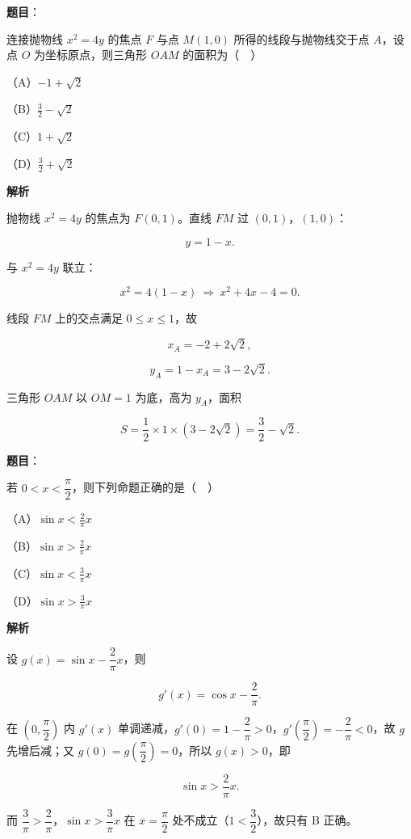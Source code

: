 \begin{answer}

\textbf{题目}：

连接抛物线 $x^2=4y$ 的焦点 $F$ 与点 $M(1,0)$ 所得的线段与抛物线交于点 $A$，设点 $O$ 为坐标原点，则三角形 $OAM$ 的面积为（　）

（A）$-1+\sqrt2$

（B）$\frac32-\sqrt2$

（C）$1+\sqrt2$

（D）$\frac32+\sqrt2$

\textbf{解析}

抛物线 $x^2=4y$ 的焦点为 $F(0,1)$。直线 $FM$ 过 $(0,1)$，$(1,0)$：

\nopagebreak[4]
\[y=1-x.\]

与 $x^2=4y$ 联立：

\nopagebreak[4]
\[x^2=4(1-x)\ \Rightarrow\ x^2+4x-4=0.\]

线段 $FM$ 上的交点满足 $0\leqslant x\leqslant1$，故

\nopagebreak[4]
\[x_A=-2+2\sqrt2,\]

\nopagebreak[4]
\[y_A=1-x_A=3-2\sqrt2.\]

三角形 $OAM$ 以 $OM=1$ 为底，高为 $y_A$，面积

\nopagebreak[4]
\[S=\frac12\times1\times(3-2\sqrt2)=\frac32-\sqrt2.\]


\end{answer}
\begin{answer}

\textbf{题目}：

若 $0<x<\dfrac{\pi}{2}$，则下列命题正确的是（　）

（A）$\sin x<\frac2\pi x$

（B）$\sin x>\frac2\pi x$

（C）$\sin x<\frac3\pi x$

（D）$\sin x>\frac3\pi x$

\textbf{解析}

设 $g(x)=\sin x-\dfrac2\pi x$，则

\nopagebreak[4]
\[g'(x)=\cos x-\frac2\pi.\]

在 $\left(0,\dfrac{\pi}{2}\right)$ 内 $g'(x)$ 单调递减，$g'(0)=1-\dfrac2\pi>0$，$g'\left(\dfrac{\pi}{2}\right)=-\dfrac2\pi<0$，故 $g$ 先增后减；又 $g(0)=g\left(\dfrac{\pi}{2}\right)=0$，所以 $g(x)>0$，即

\nopagebreak[4]
\[\sin x>\frac2\pi x.\]

而 $\dfrac3\pi>\dfrac2\pi$，$\sin x>\dfrac3\pi x$ 在 $x=\dfrac{\pi}{2}$ 处不成立（$1<\dfrac32$），故只有 B 正确。


\end{answer}
